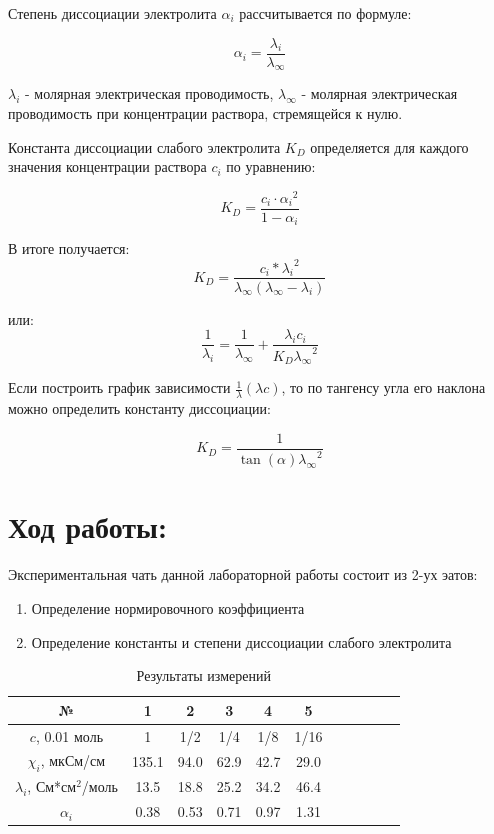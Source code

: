 \documentclass[a4paper,12pt]{article}
\begin{document}
Степень диссоциации электролита $\alpha_{i}$ рассчитывается по формуле:

\begin{equation} \nonumber
    \alpha_{i} = \frac{\lambda_{i}}{\lambda_{\infty}}
\end{equation}


$\lambda_{i}$ - молярная электрическая проводимость, $\lambda_{\infty}$ - молярная электрическая проводимость при концентрации раствора, стремящейся к нулю.

Константа диссоциации слабого электролита $K_{D}$ определяется для каждого значения концентрации раствора $c_{i}$ по уравнению:

\begin{equation} \nonumber
    K_{D} = \frac{c_i \cdot {\alpha_{i}}^2}{1-\alpha_{i}}
\end{equation}

В итоге получается:
\begin{equation} \nonumber
    K_D = \frac{c_i * {\lambda_i}^2}{\lambda_{\infty}(\lambda_{\infty}-\lambda_i)}
\end{equation}

или:
\begin{equation}
    \frac{1}{\lambda_i} = \frac{1}{\lambda_{\infty}} + \frac{\lambda_i c_i}{K_D {\lambda_{\infty}}^2}
    \nonumber
\end{equation}

Если построить график зависимости $\frac{1}{\lambda} (\lambda c)$, то по тангенсу угла его наклона можно  определить константу диссоциации:

\begin{equation}
    K_D = \frac{1}{\tan({\alpha}){\lambda_{\infty}}^2}
    \nonumber
\end{equation}

\section*{Ход работы:}
Экспериментальная чать данной лабораторной работы состоит из 2-ух эатов:

\begin{enumerate}
    \item Определение нормировочного коэффициента 
    \item Определение константы и степени диссоциации слабого электролита
\end{enumerate}

    \begin{table}[h]
    \centering
    \begin{tabular}{|c|c|c|c|c|c|c|c|c|c|c|}
    \hline
        № & 1 & 2 & 3 & 4 & 5\\ \hline
        $c$, 0.01 моль & 1 & 1/2 & 1/4 & 1/8 & 1/16\\ \hline
        $\chi_{i}$, мкСм/см & 135.1 & 94.0 & 62.9 & 42.7 & 29.0\\ \hline
        $\lambda_{i}$, См*см$^2$/моль & 13.5 & 18.8 & 25.2 & 34.2 & 46.4\\ \hline
        $\alpha_{i} $ & 0.38 & 0.53 & 0.71 & 0.97 & 1.31\\  \hline
    \end{tabular}
    \caption{Результаты измерений}
    \label{table_Delta_nu,tau}
    \end{table}
\end{document}
